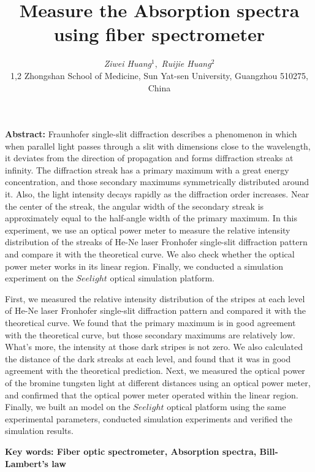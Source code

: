 \documentclass[12pt,a4paper,UTF8]{ctexart}
\begin{document}
\title{\Large\bfseries Measure the Absorption spectra using fiber spectrometer\footnotemark[1]}
\author{\large\textit{Ziwei Huang}$^{1}$\footnotemark[2],\ \large\textit{Ruijie Huang}$^{2}$\footnotemark[3] \\ 
\small{1,2 Zhongshan School of Medicine, Sun Yat-sen University, Guangzhou  { \rm 510275}, China}}
\date{}
\maketitle\thispagestyle{empty} 

\vspace{-1.5em}
\begin{spacing}{1.5}
{\bfseries Abstract:}
Fraunhofer single-slit diffraction describes a phenomenon in which when parallel light passes through a slit with dimensions close to the wavelength, it deviates from the direction of propagation and forms diffraction streaks at infinity. 
The diffraction streak has a primary maximum with a great energy concentration, and those secondary maximums symmetrically distributed around it. 
Also, the light intensity decays rapidly as the diffraction order increases. 
Near the center of the streak, the angular width of the secondary streak is approximately equal to the half-angle width of the primary maximum. 
In this experiment, we use an optical power meter to measure the relative intensity distribution of the streaks of He-Ne laser Fronhofer single-slit diffraction pattern and compare it with the theoretical curve. 
We also check whether the optical power meter works in its linear region. 
Finally, we conducted a simulation experiment on the $Seelight$ optical simulation platform.

First, we measured the relative intensity distribution of the stripes at each level of He-Ne laser Fronhofer single-slit diffraction pattern and compared it with the theoretical curve. 
We found that the primary maximum is in good agreement with the theoretical curve, but those secondary maximums are relatively low. What’s more, the intensity at those dark stripes is not zero. 
We also calculated the  distance of the dark streaks at each level, and found that it was in good agreement with the theoretical prediction. 
Next, we measured the optical power of the bromine tungsten light at different distances using an optical power meter, and confirmed that the optical power meter operated within the linear region. 
Finally, we built an model on the $Seelight$ optical platform using the same experimental parameters, conducted simulation experiments and verified the simulation results.
\par
\bfseries{Key words}: Fiber optic spectrometer, Absorption spectra, Bill-Lambert's law
\vspace{2em}
\end{spacing}

\renewcommand{\thefootnote}{\fnsymbol{footnote}}
\end{document}
